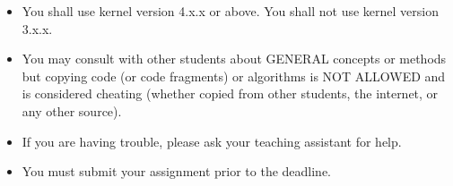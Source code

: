 \documentclass{article}
\begin{document}
\begin{itemize}
    \item You shall use kernel version 4.x.x or above. You shall not use kernel version 3.x.x.
    \item You may consult with other students about GENERAL concepts or methods but copying code (or code fragments) or algorithms is NOT ALLOWED and is considered cheating (whether copied from other students, the internet, or any other source).
    \item If you are having trouble, please ask your teaching assistant for help.
    \item You must submit your assignment prior to the deadline.
\end{itemize}
\end{document}
